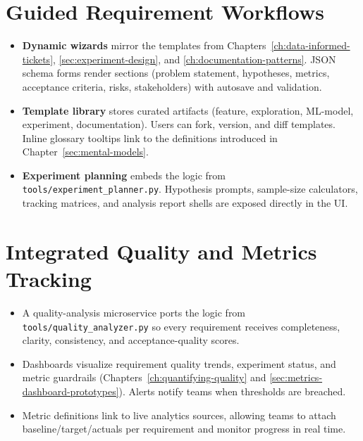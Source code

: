 \section{Guided Requirement Workflows}
\begin{itemize}
    \item \textbf{Dynamic wizards} mirror the templates from Chapters~\ref{ch:data-informed-tickets}, \ref{sec:experiment-design}, and \ref{ch:documentation-patterns}. JSON schema forms render sections (problem statement, hypotheses, metrics, acceptance criteria, risks, stakeholders) with autosave and validation.
    \item \textbf{Template library} stores curated artifacts (feature, exploration, ML-model, experiment, documentation). Users can fork, version, and diff templates. Inline glossary tooltips link to the definitions introduced in Chapter~\ref{sec:mental-models}.
    \item \textbf{Experiment planning} embeds the logic from \texttt{tools/experiment\_planner.py}. Hypothesis prompts, sample-size calculators, tracking matrices, and analysis report shells are exposed directly in the UI.
\end{itemize}

\section{Integrated Quality and Metrics Tracking}
\begin{itemize}
    \item A quality-analysis microservice ports the logic from \texttt{tools/quality\_analyzer.py} so every requirement receives completeness, clarity, consistency, and acceptance-quality scores.
    \item Dashboards visualize requirement quality trends, experiment status, and metric guardrails (Chapters~\ref{ch:quantifying-quality} and \ref{sec:metrics-dashboard-prototypes}). Alerts notify teams when thresholds are breached.
    \item Metric definitions link to live analytics sources, allowing teams to attach baseline/target/actuals per requirement and monitor progress in real time.
\end{itemize}

